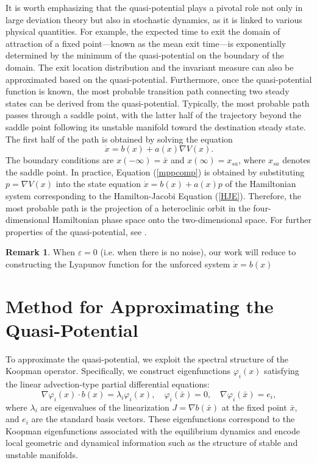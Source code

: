\documentclass[11pt]{article}
\theoremstyle{plain}      %
\theoremstyle{definition} %
\newtheorem{remark}[theorem]{Remark}
\begin{document}
It is worth emphasizing that the quasi-potential plays a pivotal role not only in large deviation theory but also in stochastic dynamics, as it is linked to various physical quantities. For example, the expected time to exit the domain of attraction of a fixed point—known as the mean exit time—is exponentially determined by the minimum of the quasi-potential on the boundary of the domain. The exit location distribution and the invariant measure can also be approximated based on the quasi-potential. Furthermore, once the quasi-potential function is known, the most probable transition path connecting two steady states can be derived from the quasi-potential. Typically, the most probable path passes through a saddle point, with the latter half of the trajectory beyond the saddle point following its unstable manifold toward the destination steady state. The first half of the path is obtained by solving the equation \begin{equation}\label{mppcomp}
\dot{x} = b(x) + a(x) \nabla V(x).
\end{equation}
The boundary conditions are $x(-\infty)=\bar{x}$ and $x(\infty)=x_{sa}$, where $x_{sa}$ denotes the saddle point. In practice, Equation (\ref{mppcomp}) is obtained by substituting $p= \nabla V(x)$ into the state equation $\dot{x} = b(x) + a(x)p$ of the Hamiltonian system corresponding to the Hamilton-Jacobi Equation (\ref{HJE}). Therefore, the most probable path is the projection of a heteroclinic orbit in the four-dimensional Hamiltonian phase space onto the two-dimensional space. For further properties of the quasi-potential, see \cite{Freidlin2012}. \begin{remark}
When $\varepsilon = 0$ (i.e. when there is no noise), our work will reduce to constructing the Lyapunov function for the unforced system $\dot{x} = b(x)$ \cite{giesl2019approximation, lee2024note}
\end{remark}


\section{Method for Approximating the Quasi-Potential}\label{methsec}

To approximate the quasi-potential, we exploit the spectral structure of the Koopman operator. Specifically, we construct eigenfunctions \( \varphi_i(x) \) satisfying the linear advection-type partial differential equations:
\begin{equation}
\nabla \varphi_i(x) \cdot b(x) = \lambda_i \varphi_i(x), \quad \varphi_i(\bar{x}) = 0, \quad \nabla \varphi_i(\bar{x}) = e_i,
\end{equation}
where \( \lambda_i \) are eigenvalues of the linearization \( J = \nabla b(\bar{x}) \) at the fixed point \( \bar{x} \), and \( e_i \) are the standard basis vectors. These eigenfunctions correspond to the Koopman eigenfunctions associated with the equilibrium dynamics and encode local geometric and dynamical information such as the structure of stable and unstable manifolds.
\end{document}

